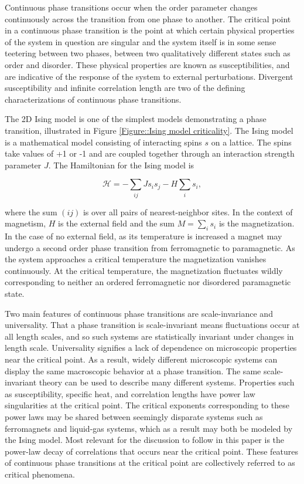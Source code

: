 \documentclass[12pt]{article}
\begin{document}
Continuous phase transitions occur when the order parameter changes continuously across the transition from one phase to another. The critical point in a continuous phase transition is the point at which certain physical properties of the system in question are singular and the system itself is in some sense teetering between two phases, between two qualitatively different states such as order and disorder. These physical properties are known as susceptibilities, and are indicative of the response of the system to external perturbations. Divergent susceptibility and infinite correlation length are two of the defining characterizations of continuous phase transitions.

The 2D Ising model is one of the simplest models demonstrating a phase transition, illustrated in Figure \ref{Figure::Ising model criticality}. The Ising model is a mathematical model consisting of interacting spins $s$ on a lattice. The spins take values of +1 or -1 and are coupled together through an interaction strength parameter $J$. The Hamiltonian for the Ising model is

\begin{equation}
\mathcal{H} = - \sum_{ij}Js_{i}s_{j} - H\sum_{i}s_{i},
\end{equation}

where the sum $(ij)$ is over all pairs of nearest-neighbor sites. In the context of magnetism, $H$ is the external field and the sum $M=\sum_{i}s_{i}$ is the magnetization. In the case of no external field, as its temperature is increased a magnet may undergo a second order phase transition from ferromagnetic to paramagnetic. As the system approaches a critical temperature the magnetization vanishes continuously. At the critical temperature, the magnetization fluctuates wildly corresponding to neither an ordered ferromagnetic nor disordered paramagnetic state.

Two main features of continuous phase transitions are scale-invariance and universality. That a phase transition is scale-invariant means fluctuations occur at all length scales, and so such systems are statistically invariant under changes in length scale. Universality signifies a lack of dependence on microscopic properties near the critical point. As a result, widely different microscopic systems can display the same macroscopic behavior at a phase transition. The same scale-invariant theory can be used to describe many different systems. Properties such as susceptibility, specific heat, and correlation lengths have power law singularities at the critical point. The critical exponents corresponding to these power laws  may be shared between seemingly disparate systems such as ferromagnets and liquid-gas systems, which as a result may both be modeled by the Ising model. Most relevant for the discussion to follow in this paper is the power-law decay of correlations that occurs near the critical point. These features of continuous phase transitions at the critical point are collectively referred to as critical phenomena.
\end{document}
